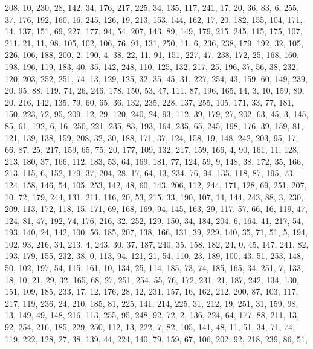 \begin{DoxyCode}
       208, 10, 230, 28, 142, 34, 176, 217, 225, 34, 135, 117, 241, 17, 20, 36, 83, 6, 255, 37, 176, 192, 160, 16,
       245, 126, 19, 213, 153, 144, 162, 17, 20, 182, 155, 104, 171, 14, 137, 151, 69, 227, 177, 94, 54, 207, 143,
       89, 149, 179, 215, 245, 115, 175, 107, 211, 21, 11, 98, 105, 102, 106, 76, 91, 131, 250, 11, 6, 236, 238,
       179, 192, 32, 105, 226, 106, 188, 200, 2, 190, 4, 38, 22, 11, 91, 151, 227, 47, 238, 172, 25, 168, 160, 198,
       196, 119, 183, 40, 35, 142, 248, 110, 125, 132, 217, 25, 196, 37, 56, 38, 232, 120, 203, 252, 251, 74, 13,
       129, 125, 32, 35, 45, 31, 227, 254, 43, 159, 60, 149, 239, 20, 95, 88, 119, 74, 26, 246, 178, 150, 53, 47,
       111, 87, 196, 165, 14, 3, 10, 159, 80, 20, 216, 142, 135, 79, 60, 65, 36, 132, 235, 228, 137, 255, 105, 171,
       33, 77, 181, 150, 223, 72, 95, 209, 12, 29, 120, 240, 24, 93, 112, 39, 179, 27, 202, 63, 45, 3, 145, 85, 61,
       192, 6, 16, 250, 221, 235, 83, 193, 164, 235, 65, 245, 198, 176, 39, 159, 81, 121, 139, 138, 159, 208, 32,
       30, 188, 171, 37, 124, 158, 19, 148, 242, 203, 95, 17, 66, 87, 25, 217, 159, 65, 75, 20, 177, 109, 132, 217,
       159, 166, 4, 90, 161, 11, 128, 213, 180, 37, 166, 112, 183, 53, 64, 169, 181, 77, 124, 59, 9, 148, 38, 172,
       35, 166, 213, 115, 6, 152, 179, 37, 204, 28, 17, 64, 13, 234, 76, 94, 135, 118, 87, 195, 73, 124, 158, 146,
       54, 105, 253, 142, 48, 60, 143, 206, 112, 244, 171, 128, 69, 251, 207, 10, 72, 179, 244, 131, 211, 116, 20,
       53, 215, 33, 190, 107, 14, 144, 243, 88, 3, 230, 209, 113, 172, 118, 15, 171, 69, 168, 169, 94, 145, 163,
       29, 117, 57, 66, 16, 119, 47, 124, 81, 47, 192, 74, 176, 216, 32, 252, 129, 150, 34, 184, 204, 6, 164, 41,
       217, 54, 193, 140, 24, 142, 100, 56, 185, 207, 138, 166, 131, 39, 229, 140, 35, 71, 51, 5, 194, 102, 93, 216,
       34, 213, 4, 243, 30, 37, 187, 240, 35, 158, 182, 24, 0, 45, 147, 241, 82, 193, 179, 155, 232, 38, 0, 113, 94,
       121, 21, 54, 110, 23, 189, 100, 43, 51, 253, 148, 50, 102, 197, 54, 115, 161, 10, 134, 25, 114, 185, 73,
       74, 185, 165, 34, 251, 7, 133, 18, 10, 21, 29, 32, 165, 68, 27, 251, 254, 55, 76, 172, 231, 21, 187, 242, 134,
       130, 151, 109, 185, 233, 17, 12, 176, 28, 12, 231, 157, 16, 162, 212, 200, 87, 103, 117, 217, 119, 236, 24,
       210, 185, 81, 225, 141, 214, 225, 31, 212, 19, 251, 31, 159, 98, 13, 149, 49, 148, 216, 113, 255, 95, 248,
       92, 72, 2, 136, 224, 64, 177, 88, 211, 13, 92, 254, 216, 185, 229, 250, 112, 13, 222, 7, 82, 105, 141, 48,
       11, 51, 34, 71, 74, 119, 222, 128, 27, 38, 139, 44, 224, 140, 79, 159, 67, 106, 202, 92, 218, 239, 86, 51,

\end{DoxyCode}
